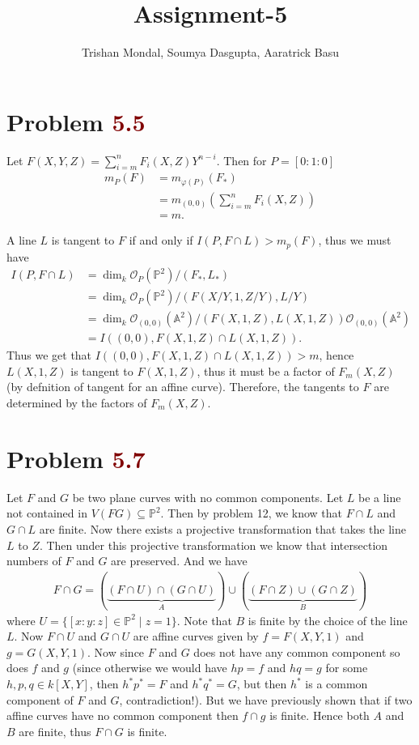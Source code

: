 \documentclass[12pt]{article}
\title{\textbf{Assignment-5}}
\author{Trishan Mondal, Soumya Dasgupta, Aaratrick Basu}
\date{}
\begin{document}
\maketitle

\section*{Problem \textcolor{maroon}{5.5}}
Let $F(X,Y,Z) = \sum_{i=m}^n F_i(X,Z) Y^{n-i}$. Then for $P = [0:1:0]$
\begin{align*}
   m_P(F) & = m_{\varphi(P)}(F_*)              \\
          & = m_{(0,0)}(\sum_{i=m}^n F_i(X,Z)) \\
          & = m.
\end{align*}

A line $L$ is tangent to $F$ if and only if $I(P, F \cap L) > m_p(F)$, thus we must have
\begin{align*}
   I(P,F \cap L) & = \dim_{k} \mathscr{O}_P(\mathbb{P}^2)/(F_*,L_*)                                                  \\
                 & = \dim_k \mathscr{O}_P(\mathbb{P}^2)/(F(X/Y,1,Z/Y), L/Y)                                          \\
                 & = \dim_k \mathscr{O}_{(0,0)}(\mathbb{A}^2)/(F(X,1,Z), L(X,1,Z)) \mathscr{O}_{(0,0)}(\mathbb{A}^2) \\
                 & = I((0,0), F(X,1,Z) \cap L(X,1,Z)).
\end{align*}
Thus we get that $I((0,0), F(X,1,Z) \cap L(X,1,Z)) > m$, hence $L(X,1,Z)$ is tangent to $F(X,1,Z)$, thus it must be a factor of $F_m(X,Z)$ (by defnition of tangent for an affine curve). Therefore, the tangents to $F$ are determined by the factors of $F_m(X,Z)$.

\section*{Problem \textcolor{maroon}{5.7}}
Let $F$ and $G$ be two plane curves with no common components. Let $L$ be a line not contained in $V(FG) \subseteq \mathbb{P}^2$. Then by problem 12, we know that $F \cap L$ and $G \cap L$ are finite. Now there exists a projective transformation that takes the line $L$ to $Z$. Then under this projective transformation we know that intersection numbers of $F$ and $G$ are preserved. And we have
\begin{align*}
   F \cap G = (\underbrace{(F \cap U) \cap (G \cap U)}_{A}) \cup (\underbrace{(F \cap Z) \cup (G \cap Z)}_{B})
\end{align*}
where $U = \{ [x:y:z] \in \mathbb{P}^2 \mid z = 1 \}$. Note that $B$ is finite by the choice of the line $L$. Now $F \cap U$ and $G \cap U$ are affine curves given by $f = F(X,Y,1)$ and $g = G(X,Y,1)$. Now since $F$ and $G$ does not have any common component so does $f$ and $g$ (since otherwise we would have $hp = f$ and $hq = g$ for some $h,p,q \in k[X,Y]$, then $h^* p^* = F$ and $h^* q^* = G$, but then $h^*$ is a common component of $F$ and $G$, contradiction!). But we have previously shown that if two affine curves have no common component then $f \cap g$ is finite. Hence both $A$ and $B$ are finite, thus $F \cap G$ is finite.
\end{document}
